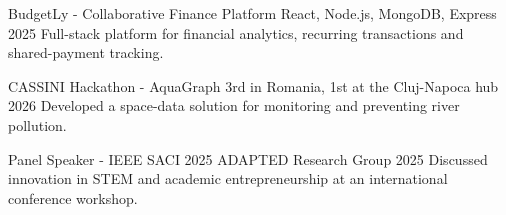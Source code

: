 \documentclass[10pt]{spidercv}
\begin{document}
\begin{MainPart}
  \Experience
    {\ColorHighlight}
    {BudgetLy - Collaborative Finance Platform}
    {React, Node.js, MongoDB, Express}
    {\textcolor{\ColorTextMain}{2025}}
    {Full-stack platform for financial analytics, recurring transactions and shared-payment tracking.}

  \Experience
    {\ColorHighlight}
    {CASSINI Hackathon - AquaGraph}
    {3rd in Romania, 1st at the Cluj-Napoca hub}
    {\textcolor{\ColorTextMain}{2026}}
    {Developed a space-data solution for monitoring and preventing river pollution.}

  \Experience
    {\ColorHighlight}
    {Panel Speaker - IEEE SACI 2025}
    {ADAPTED Research Group}
    {\textcolor{\ColorTextMain}{2025}}
    {Discussed innovation in STEM and academic entrepreneurship at an international conference workshop.}

\end{MainPart}
\end{document}
